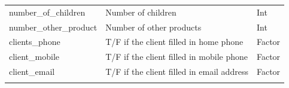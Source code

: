 \documentclass[
]{article}
\begin{document}
\begin{longtable}[]{@{}lll@{}}
\begin{minipage}[t]{0.30\columnwidth}
number\_of\_children\strut
\end{minipage} & \begin{minipage}[t]{0.30\columnwidth}\raggedright
Number of children\strut
\end{minipage} & \begin{minipage}[t]{0.30\columnwidth}\raggedright
Int\strut
\end{minipage}\tabularnewline
\begin{minipage}[t]{0.30\columnwidth}\raggedright
number\_other\_product\strut
\end{minipage} & \begin{minipage}[t]{0.30\columnwidth}\raggedright
Number of other products\strut
\end{minipage} & \begin{minipage}[t]{0.30\columnwidth}\raggedright
Int\strut
\end{minipage}\tabularnewline
\begin{minipage}[t]{0.30\columnwidth}\raggedright
clients\_phone\strut
\end{minipage} & \begin{minipage}[t]{0.30\columnwidth}\raggedright
T/F if the client filled in home phone\strut
\end{minipage} & \begin{minipage}[t]{0.30\columnwidth}\raggedright
Factor\strut
\end{minipage}\tabularnewline
\begin{minipage}[t]{0.30\columnwidth}\raggedright
client\_mobile\strut
\end{minipage} & \begin{minipage}[t]{0.30\columnwidth}\raggedright
T/F if the client filled in mobile phone\strut
\end{minipage} & \begin{minipage}[t]{0.30\columnwidth}\raggedright
Factor\strut
\end{minipage}\tabularnewline
\begin{minipage}[t]{0.30\columnwidth}\raggedright
client\_email\strut
\end{minipage} & \begin{minipage}[t]{0.30\columnwidth}\raggedright
T/F if the client filled in email address\strut
\end{minipage} & \begin{minipage}[t]{0.30\columnwidth}\raggedright
Factor\strut
\end{minipage}\tabularnewline
\begin{minipage}[t]{0.30\columnwidth}\raggedright

\end{minipage}
\end{longtable}
\end{document}
